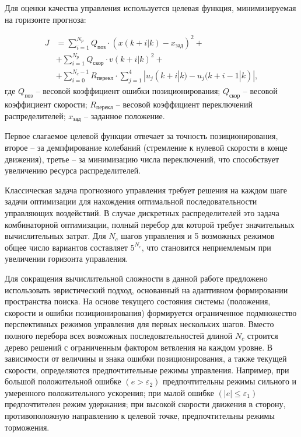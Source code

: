 Для оценки качества управления используется целевая функция, минимизируемая на горизонте прогноза:

\begin{equation}
	\begin{aligned}
		J & = \sum_{i=1}^{N_p} Q_{\text{поз}} \cdot (x(k+i|k) - x_{\text{зад}})^2 +                 \\
		  & + \sum_{i=1}^{N_p} Q_{\text{скор}} \cdot v(k+i|k)^2 +                                   \\
		  & + \sum_{i=0}^{N_c-1} R_{\text{перекл}} \cdot \sum_{j=1}^{4} |u_j(k+i|k) - u_j(k+i-1|k)|,
	\end{aligned}
\end{equation}
где $Q_{\text{поз}}$ -- весовой коэффициент ошибки позиционирования;
$Q_{\text{скор}}$ -- весовой коэффициент скорости;
$R_{\text{перекл}}$ -- весовой коэффициент переключений распределителей;
$x_{\text{зад}}$ -- заданное положение.

Первое слагаемое целевой функции отвечает за точность позиционирования,
второе -- за демпфирование колебаний (стремление к нулевой скорости в конце движения), третье -- за минимизацию числа переключений,
что способствует увеличению ресурса распределителей.

Классическая задача прогнозного управления требует решения на каждом шаге задачи оптимизации для
нахождения оптимальной последовательности управляющих воздействий. В случае дискретных распределителей
это задача комбинаторной оптимизации, полный перебор для которой требует значительных
вычислительных затрат. Для $N_c$ шагов управления и 5 возможных
режимов общее число вариантов составляет $5^{N_c}$, что становится
неприемлемым при увеличении горизонта управления.

Для сокращения вычислительной сложности в данной работе предложено использовать эвристический
подход, основанный на адаптивном формировании пространства поиска.
На основе текущего состояния системы (положения, скорости и ошибки позиционирования)
формируется ограниченное подмножество перспективных режимов управления для
первых нескольких шагов. Вместо полного перебора всех возможных последовательностей
длиной $N_c$ строится дерево решений с ограниченным фактором ветвления на каждом уровне. В
зависимости от величины и знака ошибки позиционирования, а также
текущей скорости, определяются предпочтительные режимы управления.
Например, при большой положительной ошибке $(e > \varepsilon_2)$ предпочтительны
режимы сильного и умеренного положительного ускорения; при малой ошибке
$(|e| \leq \varepsilon_1)$ предпочтителен режим удержания; при высокой скорости движения в
сторону, противоположную направлению к целевой точке, предпочтительны режимы торможения.

